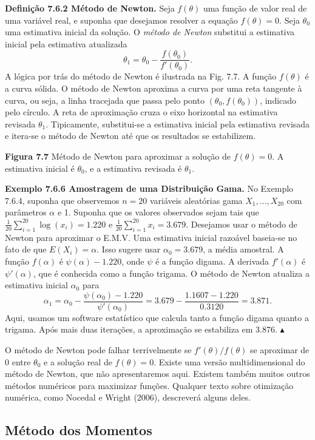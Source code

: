\textbf{Definição 7.6.2 Método de Newton.} Seja $f(\theta)$ uma função de valor real de uma variável real, e suponha que desejamos resolver a equação $f(\theta)=0$. Seja $\theta_0$ uma estimativa inicial da solução. O \textit{método de Newton} substitui a estimativa inicial pela estimativa atualizada
$$ \theta_1 = \theta_0 - \frac{f(\theta_0)}{f'(\theta_0)}. $$
A lógica por trás do método de Newton é ilustrada na Fig. 7.7. A função $f(\theta)$ é a curva sólida. O método de Newton aproxima a curva por uma reta tangente à curva, ou seja, a linha tracejada que passa pelo ponto $(\theta_0, f(\theta_0))$, indicado pelo círculo. A reta de aproximação cruza o eixo horizontal na estimativa revisada $\theta_1$. Tipicamente, substitui-se a estimativa inicial pela estimativa revisada e itera-se o método de Newton até que os resultados se estabilizem.

\textbf{Figura 7.7} Método de Newton para aproximar a solução de $f(\theta)=0$. A estimativa inicial é $\theta_0$, e a estimativa revisada é $\theta_1$.

\textbf{Exemplo 7.6.6 Amostragem de uma Distribuição Gama.} No Exemplo 7.6.4, suponha que observemos $n=20$ variáveis aleatórias gama $X_1, \dots, X_{20}$ com parâmetros $\alpha$ e 1. Suponha que os valores observados sejam tais que $\frac{1}{20} \sum_{i=1}^{20} \log(x_i) = 1.220$ e $\frac{1}{20} \sum_{i=1}^{20} x_i = 3.679$. Desejamos usar o método de Newton para aproximar o E.M.V. Uma estimativa inicial razoável baseia-se no fato de que $E(X_i) = \alpha$. Isso sugere usar $\alpha_0 = 3.679$, a média amostral. A função $f(\alpha)$ é $\psi(\alpha) - 1.220$, onde $\psi$ é a função digama. A derivada $f'(\alpha)$ é $\psi'(\alpha)$, que é conhecida como a função trigama. O método de Newton atualiza a estimativa inicial $\alpha_0$ para
$$ \alpha_1 = \alpha_0 - \frac{\psi(\alpha_0) - 1.220}{\psi'(\alpha_0)} = 3.679 - \frac{1.1607 - 1.220}{0.3120} = 3.871. $$
Aqui, usamos um software estatístico que calcula tanto a função digama quanto a trigama. Após mais duas iterações, a aproximação se estabiliza em 3.876. $\blacktriangle$

O método de Newton pode falhar terrivelmente se $f'(\theta)/f(\theta)$ se aproximar de 0 entre $\theta_0$ e a solução real de $f(\theta)=0$. Existe uma versão multidimensional do método de Newton, que não apresentaremos aqui. Existem também muitos outros métodos numéricos para maximizar funções. Qualquer texto sobre otimização numérica, como Nocedal e Wright (2006), descreverá alguns deles.

\subsection*{Método dos Momentos}

